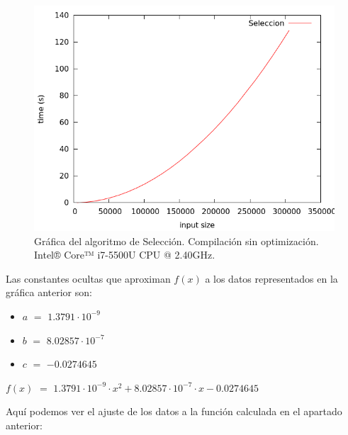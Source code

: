 \documentclass[11pt,a4paper]{article}
\begin{document}
				\begin{figure}[h]

					\centering
					\includegraphics[width=1\textwidth]{seleccion.png}
					\caption{Gráfica del algoritmo de Selección. Compilación sin optimización. Intel® Core™ i7-5500U CPU @ 2.40GHz.}

				\end{figure}

				\par
				Las constantes ocultas que aproximan $f(x)$ a los datos representados en la gráfica anterior son:

				\begin{itemize}

					\item
					$a$ $=$ $1.3791\cdot 10^{-9}$
					\item
					$b$ $=$ $8.02857\cdot 10^{-7}$
					\item
					$c$ $=$ $-0.0274645$

				\end{itemize}

				\par
				$f(x)$ $=$ $ 1.3791\cdot 10^{-9}\cdot x^2 + 8.02857\cdot 10^{-7}\cdot x - 0.0274645$

\newpage

				\par
				Aquí podemos ver el ajuste de los datos a la función calculada en el apartado anterior:
\end{document}
